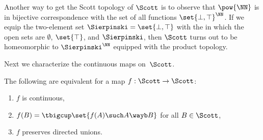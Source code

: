 Another way to get the Scott topology of $\Scott$ is to observe that
$\pow{\NN}$ is in bijective correspondence with the set of all
functions $\set{\bot, \top}^{\NN}$. If we equip the two-element set
$\Sierpinski = \set{\bot, \top}$ with the  in
which the open sets are $\emptyset$, $\set{\top}$, and $\Sierpinski$, then
$\Scott$ turns out to be homeomorphic to $\Sierpinski^{\NN}$ equipped with
the product topology.

Next we characterize the continuous maps on~$\Scott$.

\begin{proposition}
  The following are equivalent for a map $f : \Scott \to \Scott$:
  \begin{enumerate}
  \item $f$ is continuous,
  \item $f(B) = \tbigcup \set{f(A) \such A \wayb B}$ for all $B \in \Scott$,
  \item $f$ preserves directed unions.
  \end{enumerate}
\end{proposition}

